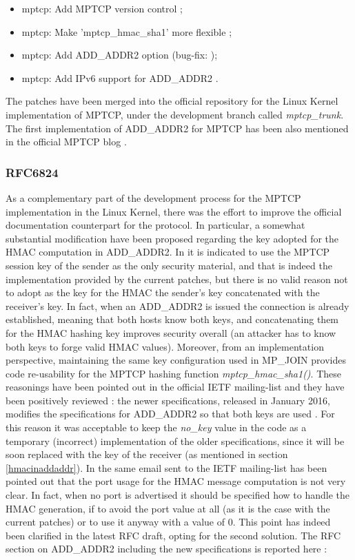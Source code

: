 \begin{itemize}
  \item mptcp: Add MPTCP version control \cite{patch1};
  \item mptcp: Make 'mptcp\_hmac\_sha1' more flexible \cite{patch2};
  \item mptcp: Add ADD\_ADDR2 option \cite{patch3} (bug-fix: \cite{patch5});
  \item mptcp: Add IPv6 support for ADD\_ADDR2 \cite{patch4}.
\end{itemize}

The patches have been merged into the official repository for the Linux Kernel implementation of MPTCP, under the development branch called \textit{mptcp\_trunk}.
The first implementation of ADD\_ADDR2 for MPTCP has been also mentioned in the official MPTCP blog \cite{blog}.

\subsubsection{RFC6824}
As a complementary part of the development process for the MPTCP implementation in the Linux Kernel, there was the effort to improve the official documentation counterpart for the protocol. In particular, a somewhat substantial modification have been proposed regarding the key adopted for the HMAC computation in ADD\_ADDR2. In  \cite{rfc6824bis04} it is indicated to use the MPTCP session key of the sender as the only security material, and that is indeed the implementation provided by the current patches, but there is no valid reason not to adopt as the key for the HMAC the sender's key concatenated with the receiver's key. In fact, when an ADD\_ADDR2 is issued the connection is already established, meaning that both hosts know both keys, and concatenating them for the HMAC hashing key improves security overall (an attacker has to know both keys to forge valid HMAC values). Moreover, from an implementation perspective, maintaining the same key configuration used in MP\_JOIN provides code re-usability for the MPTCP hashing function \textit{mptcp\_hmac\_sha1()}.
These reasonings have been pointed out in the official IETF mailing-list and they have been positively reviewed \cite{maillist}: the newer specifications, released in January 2016, modifies the specifications for ADD\_ADDR2 so that both keys are used \cite{rfc6824bis05}. For this reason it was acceptable to keep the \textit{no\_key} value in the code as a temporary (incorrect) implementation of the older specifications, since it will be soon replaced with the key of the receiver (as mentioned in section \ref{hmacinaddaddr}).
In the same email sent to the IETF mailing-list has been pointed out that the port usage for the HMAC message computation is not very clear. In fact, when no port is advertised it should be specified how to handle the HMAC generation, if to avoid the port value at all (as it is the case with the current patches) or to use it anyway with a value of 0. This point has indeed been clarified in the latest RFC draft, opting for the second solution. The RFC section on ADD\_ADDR2 including the new specifications is reported here \cite{rfc6824bis05}:

